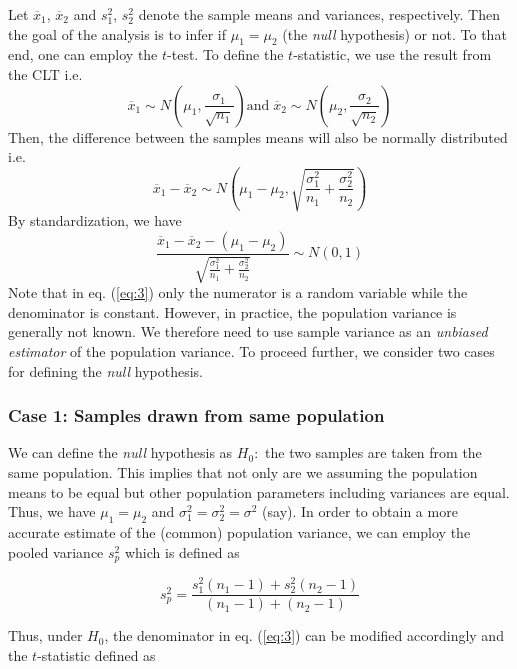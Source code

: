 \documentclass[10pt,final,Twcolumn]{IEEEtran}
\begin{document}
Let $\overline {x}_1$, $\overline {x}_2$ and $s_1^2$, $s_2^2$ denote the sample means and variances, respectively. Then the goal of the analysis is to infer if $\mu_1 = \mu_2$ (the {\it{null}} hypothesis) or not. To that end, one can employ the $t$-test. To define the $t$-statistic, we use the result from the CLT i.e.
\begin{equation}  
	\overline {x}_1 \sim N\left(\mu_1, \frac{\sigma_1}{\sqrt{n_1}}\right) \text{and} \; \overline {x}_2 \sim N\left(\mu_2, \frac{\sigma_2}{\sqrt{n_2}}\right)
\end{equation}
Then, the difference between the samples means will also be normally distributed i.e.
\begin{equation}  \label{eq:2}
	\overline {x}_1 - \overline {x}_2 \sim N\left(\mu_1-\mu_2, \sqrt {\frac{\sigma_1^2}{{n_1}}+\frac{\sigma_2^2}{{n_2}}}\right) 
\end{equation}
By standardization, we have
\begin{equation}  \label{eq:3}
	\frac{\overline {x}_1 - \overline {x}_2 - (\mu_1-\mu_2)}{\sqrt {\frac{\sigma_1^2}{{n_1}}+\frac{\sigma_2^2}{{n_2}}}} \sim N\left(0,1\right) 
\end{equation}  
Note that in eq. (\ref{eq:3}) only the numerator is a random variable while the denominator is constant. However, in practice, the population variance is generally not known. We therefore need to use sample variance as an {\it{unbiased estimator}} of the population variance. To proceed further, we consider two cases for defining the {\it{null}} hypothesis.
\subsubsection{Case 1: Samples drawn from same population}
We can define the {\it{null}} hypothesis as $H_0:$ the two samples are taken from the same population. This implies that not only are we assuming the population means to be equal but other population parameters including variances are equal. Thus, we have $\mu_1 = \mu_2$ and $\sigma_1^2 = \sigma_2^2 =\sigma^2 $ (say). In order to obtain a more accurate estimate of the (common) population variance, we can employ the pooled variance $s_p^2$ which is defined as

\begin{equation} \label{eq:6}
	s_p^2 =  { {\frac{s_1^2(n_1-1)+s_2^2(n_2-1)}{{(n_1-1)+(n_2-1)}}}} 
\end{equation}

Thus, under $H_0$, the denominator in eq. (\ref{eq:3}) can be modified accordingly and the $t$-statistic defined as
\end{document}
